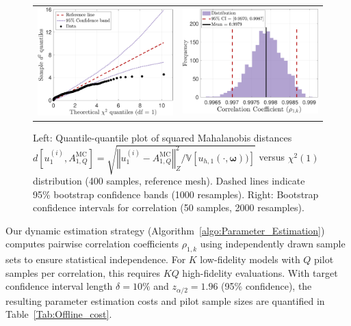 %
\begin{figure}[ht!]\centering
\begin{tabular}{cc}
\includegraphics[height=0.36\linewidth]{./figures/test_normal.pdf}&
\includegraphics[height=0.36\linewidth]{./figures/CI_bootstrap.pdf}
\end{tabular}
\caption{Left: Quantile-quantile plot of squared Mahalanobis distances $d\left[u_{1}^{(i)}, A_{1,Q}^{\text{MC}}\right] = \sqrt{\left\Vert u_{1}^{(i)} - A_{1,Q}^{\text{MC}}\right\Vert_Z^2/{\mathbb{V}\left[u_{h,1}(\cdot, \boldsymbol{\omega}))\right]}}$ versus $\chi^2(1)$ distribution (400 samples, reference mesh). Dashed lines indicate 95\% bootstrap confidence bands (1000 resamples). Right: Bootstrap confidence intervals for correlation (50 samples, 2000 resamples).
}
\label{fig:Test_normal}
\end{figure}
%



Our dynamic estimation strategy (Algorithm~\ref{algo:Parameter_Estimation}) computes pairwise correlation coefficients $\rho_{1,k}$ using independently drawn sample sets to ensure statistical independence. For $K$ low-fidelity models with $Q$ pilot samples per correlation, this requires $KQ$ high-fidelity evaluations. With target confidence interval length $\delta = 10\%$ and $z_{\alpha/2} = 1.96$ (95\% confidence), the resulting parameter estimation costs and pilot sample sizes are quantified in Table~\ref{Tab:Offline_cost}. 



